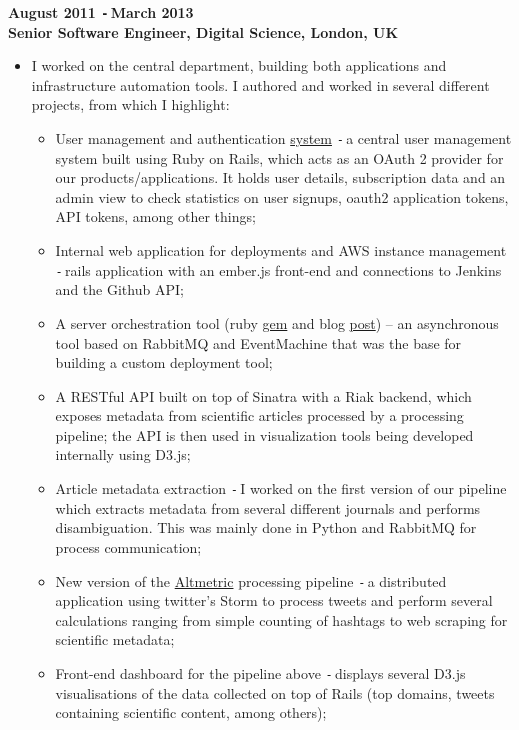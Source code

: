 \documentclass{res}
\def\Minus{\texttt{-}\,}
\begin{document}
\begin{resume}
  {\bf August 2011 \Minus March 2013}\\
  {\bf Senior Software Engineer, Digital Science, London, UK}
    \begin{itemize} %
      \item[] I worked on the central department, building both
      applications and infrastructure automation tools. I authored and worked
      in several different projects, from which I highlight:
        \begin{itemize}
        \item User management and authentication \href{https://auth.digital-science.com/}{system} \Minus a central user management
        system built using Ruby on Rails, which acts as an OAuth 2 provider for
        our products/applications. It holds user details, subscription data and
        an admin view to check statistics on user signups, oauth2 application
        tokens, API tokens, among other things;
        \item Internal web application for deployments and AWS instance management \Minus rails application with an ember.js front-end and connections to Jenkins and the Github API;
        \item A server orchestration tool (ruby \href{https://rubygems.org/gems/baton}{gem} and blog \href{http://www.digital-science.com/blog/posts/presenting-baton}{post}) – an asynchronous tool based on RabbitMQ and EventMachine that was the base for building a custom deployment tool;
        \item A RESTful API built on top of Sinatra with a Riak backend, which exposes metadata from scientific articles processed by a processing pipeline; the API is then used in visualization tools being developed internally using D3.js;
        \item Article metadata extraction \Minus I worked on the first version of our pipeline which extracts metadata from several different journals and performs disambiguation. This was mainly done in Python and RabbitMQ for process communication;
        \item New version of the \href{http://altmetric.com}{Altmetric} processing pipeline \Minus a distributed application using twitter’s Storm to process tweets and perform several calculations ranging from simple counting of hashtags to web scraping for scientific metadata;
        \item Front-end dashboard for the pipeline above \Minus displays several D3.js visualisations of the data collected on top of Rails (top domains, tweets containing scientific content, among others);

\end{itemize}
\end{itemize}
\end{resume}
\end{document}
